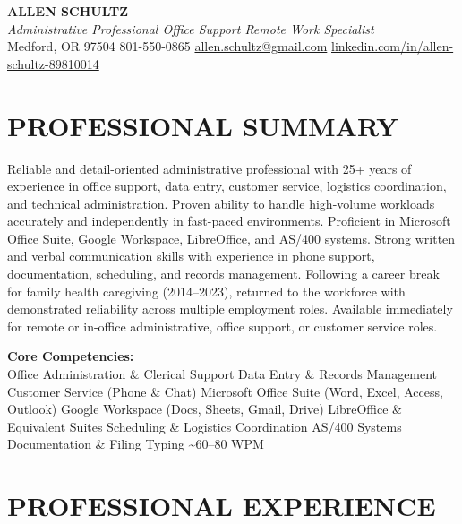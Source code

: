 \documentclass[9pt,letterpaper]{extarticle}
\begin{document}
\begin{center}
  {\LARGE\bfseries\color{accent} ALLEN SCHULTZ}\\[3pt]
  {\normalsize\itshape Administrative Professional \textbar{} Office Support \textbar{} Remote Work Specialist}\\[4pt]
  {\small
    Medford, OR 97504 \textbar{} 801-550-0865 \textbar{}
    \href{mailto:allen.schultz@gmail.com}{allen.schultz@gmail.com} \textbar{}
    \href{https://linkedin.com/in/allen-schultz-89810014}{linkedin.com/in/allen-schultz-89810014}
  }
\end{center}
\vspace{-10pt}
\section*{PROFESSIONAL SUMMARY}

Reliable and detail-oriented administrative professional with 25+ years of experience in office support, data entry, customer service, logistics coordination, and technical administration. Proven ability to handle high-volume workloads accurately and independently in fast-paced environments. Proficient in Microsoft Office Suite, Google Workspace, LibreOffice, and AS/400 systems. Strong written and verbal communication skills with experience in phone support, documentation, scheduling, and records management. Following a career break for family health caregiving (2014--2023), returned to the workforce with demonstrated reliability across multiple employment roles. Available immediately for remote or in-office administrative, office support, or customer service roles.

\smallskip
\textbf{Core Competencies:}\\
Office Administration \& Clerical Support \textbullet{}
Data Entry \& Records Management \textbullet{}
Customer Service (Phone \& Chat) \textbullet{}
Microsoft Office Suite (Word, Excel, Access, Outlook) \textbullet{}
Google Workspace (Docs, Sheets, Gmail, Drive) \textbullet{}
LibreOffice \& Equivalent Suites \textbullet{}
Scheduling \& Logistics Coordination \textbullet{}
AS/400 Systems \textbullet{}
Documentation \& Filing \textbullet{}
Typing \textasciitilde{}60--80 WPM

\section*{PROFESSIONAL EXPERIENCE}
\end{document}
